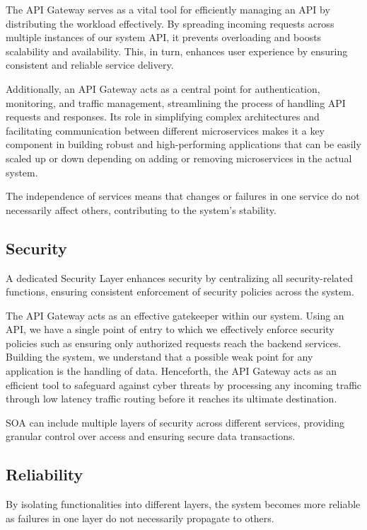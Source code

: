 \documentclass[a4paper,12pt]{article}
\begin{document}
The API Gateway serves as a vital tool for efficiently managing an API by distributing the workload effectively. By spreading incoming requests across multiple instances of our system API, it prevents overloading and boosts scalability and availability. This, in turn, enhances user experience by ensuring consistent and reliable service delivery.

Additionally, an API Gateway acts as a central point for authentication, monitoring, and traffic management, streamlining the process of handling API requests and responses. Its role in simplifying complex architectures and facilitating communication between different microservices makes it a key component in building robust and high-performing applications that can be easily scaled up or down depending on adding or removing microservices in the actual system.

The independence of services means that changes or failures in one service do not necessarily affect others, contributing to the system's stability.

\subsection{Security}
A dedicated Security Layer enhances security by centralizing all security-related functions, ensuring consistent enforcement of security policies across the system.

The API Gateway acts as an effective gatekeeper within our system. Using an API, we have a single point of entry to which we effectively enforce security policies such as ensuring only authorized requests reach the backend services. Building the system, we understand that a possible weak point for any application is the handling of data. Henceforth, the API Gateway acts as an efficient tool to safeguard against cyber threats by processing any incoming traffic through low latency traffic routing before it reaches its ultimate destination.

SOA can include multiple layers of security across different services, providing granular control over access and ensuring secure data transactions.

\subsection{Reliability}
By isolating functionalities into different layers, the system becomes more reliable as failures in one layer do not necessarily propagate to others.
\end{document}

